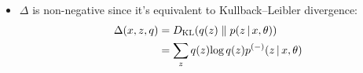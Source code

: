 \begin{frame} [t]
\begin{itemize}
{\begin{align*}
{                         {z}
                         {x,\theta}
                    }
         \end{align*}
         }
    \item $\Delta$ is non-negative since it's 
          equivalent to Kullback–Leibler 
          divergence:
        { \footnotesize 
        \begin{align*}
            \Delta (x,z,q)
           & = 
                         D _{\text{KL}} (q(z)\;\Vert\; p ( z \,\vert\, x,\theta )
                    )
           \\ & = 
            \sum _{z}  q(z) 
             \textnormal{log}\, q(z) p ^{(-)} 
                        ( z \,\vert\, x,\theta )
        \end{align*}
        }
\end{itemize} 
\end{frame}     


